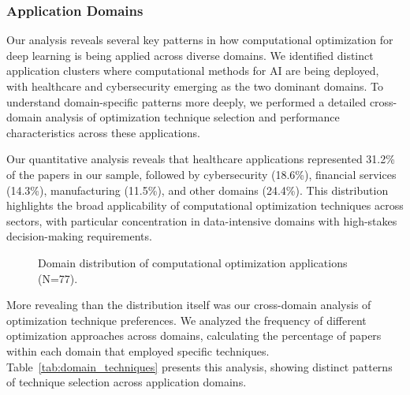 \subsubsection{Application Domains}
Our analysis reveals several key patterns in how computational optimization for deep learning is being applied across diverse domains. We identified distinct application clusters where computational methods for AI are being deployed, with healthcare and cybersecurity emerging as the two dominant domains. To understand domain-specific patterns more deeply, we performed a detailed cross-domain analysis of optimization technique selection and performance characteristics across these applications.

Our quantitative analysis reveals that healthcare applications represented 31.2\% of the papers in our sample, followed by cybersecurity (18.6\%), financial services (14.3\%), manufacturing (11.5\%), and other domains (24.4\%). This distribution highlights the broad applicability of computational optimization techniques across sectors, with particular concentration in data-intensive domains with high-stakes decision-making requirements.

\begin{figure}[ht]
\centering
{}
\caption{Domain distribution of computational optimization applications (N=77).}
\label{fig:domain_distribution}
\end{figure}

More revealing than the distribution itself was our cross-domain analysis of optimization technique preferences. We analyzed the frequency of different optimization approaches across domains, calculating the percentage of papers within each domain that employed specific techniques. Table~\ref{tab:domain_techniques} presents this analysis, showing distinct patterns of technique selection across application domains.


